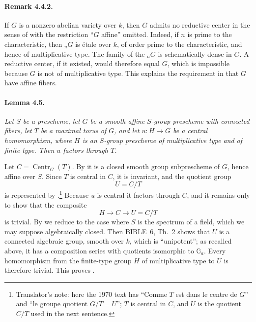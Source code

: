 \paragraph{\textbf{Remark 4.4.2.}}
If \(G\) is a nonzero abelian variety over \(k\), then \(G\) admits
no reductive center in the sense of  with the restriction
``\(G\) affine'' omitted. Indeed, if \(n\) is prime to the
characteristic, then \({}_nG\) is étale over \(k\), of order prime
to the characteristic, and hence of multiplicative type. The family
of the \({}_nG\) is schematically dense in \(G\). A reductive center,
if it existed, would therefore equal \(G\), which is impossible
because \(G\) is not of multiplicative type. This explains the
requirement in  that \(G\) have affine fibers.

\paragraph{\textbf{Lemma 4.5.}}
\emph{Let \(S\) be a prescheme, let \(G\) be a smooth affine
\(S\)-group prescheme with connected fibers, let \(T\) be a maximal
torus of \(G\), and let \(u:H\to G\) be a central homomorphism, where
\(H\) is an \(S\)-group prescheme of multiplicative type and of
finite type. Then \(u\) factors through \(T\).}

Let \(C=\operatorname{Centr}_G(T)\). By  it is a closed smooth
group subprescheme of \(G\), hence affine over \(S\). Since \(T\) is
central in \(C\), it is invariant, and the quotient group
\[
  U=C/T
\]
is represented by .\footnote{Translator's note: here the
1970 text has ``Comme \(T\) est dans le centre de \(G\)'' and ``le groupe
quotient \(G/T=U\)''; \(T\) is central in \(C\), and \(U\) is the
quotient \(C/T\) used in the next sentence.} Because \(u\) is central it factors
through \(C\), and it remains only to show that the composite
\[
  H\longrightarrow C\longrightarrow U=C/T
\]
is trivial. By  we reduce to the case where \(S\) is the
spectrum of a field, which we may suppose algebraically closed.
Then BIBLE~6, Th.~2 shows that \(U\) is a connected algebraic group,
smooth over \(k\), which is ``unipotent''; as recalled above, it has
a composition series with quotients isomorphic to \(\mathbb G_a\).
Every homomorphism from the finite-type group \(H\) of multiplicative
type to \(U\) is therefore trivial. This proves .

